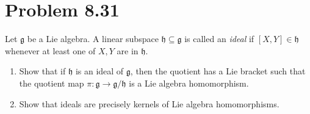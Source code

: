 \documentclass[11pt, letterpaper]{article}
\begin{document}
\section{Problem 8.31}
\begin{problem}
	Let $\mathfrak{g} $ be a Lie algebra. A linear subspace $\mathfrak{h} \subseteq \mathfrak{g} $ is called an \emph{ideal} if $[X,Y]\in \mathfrak{h} $ whenever at least one of $X,Y$ are in $\mathfrak{h} $.
	\begin{enumerate}
		\item Show that if $\mathfrak{h} $ is an ideal of $\mathfrak{g} $, then the quotient has a Lie bracket such that the quotient map $\pi : \mathfrak{g}  \to \mathfrak{g} /\mathfrak{h} $ is a Lie algebra homomorphism.
		\item Show that ideals are precisely kernels of Lie algebra homomorphisms.
	\end{enumerate}
\end{problem}
\end{document}
